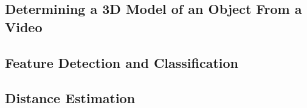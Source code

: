 \subsection{Determining a 3D Model of an Object From a Video}

\subsection{Feature Detection and Classification}

\subsection{Distance Estimation}
